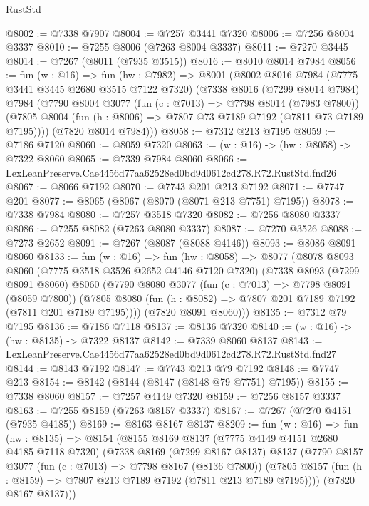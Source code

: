 \begin{lexlean}{RustStd}
\begin{coremodule}
@8002 := @7338 @7907
@8004 := @7257 @3441 @7320
@8006 := @7256 @8004 @3337
@8010 := @7255 @8006 (@7263 @8004 @3337)
@8011 := @7270 @3445
@8014 := @7267 (@8011 (@7935 @3515))
@8016 := @8010 @8014 @7984
@8056 := fun (w : @16) =>
  fun (hw : @7982) =>
  @8001
    (@8002
      @8016
      @7984
      (@7775 @3441 @3445 @2680 @3515 @7122 @7320)
      (@7338
        @8016
        (@7299 @8014 @7984)
        @7984
        (@7790
          @8004
          @3077
          (fun (c : @7013) => @7798 @8014 (@7983 @7800))
          (@7805 @8004 (fun (h : @8006) => @7807 @73 @7189 @7192 (@7811 @73 @7189 @7195))))
        (@7820 @8014 @7984)))
@8058 := @7312 @213 @7195
@8059 := @7186 @7120
@8060 := @8059 @7320
@8063 := (w : @16) -> (hw : @8058) -> @7322 @8060
@8065 := @7339 @7984 @8060
@8066 := LexLeanPreserve.Cae4456d77aa62528ed0bd9d0612cd278.R72.RustStd.fnd26
@8067 := @8066 @7192
@8070 := @7743 @201 @213 @7192
@8071 := @7747 @201
@8077 := @8065 (@8067 (@8070 (@8071 @213 @7751) @7195))
@8078 := @7338 @7984
@8080 := @7257 @3518 @7320
@8082 := @7256 @8080 @3337
@8086 := @7255 @8082 (@7263 @8080 @3337)
@8087 := @7270 @3526
@8088 := @7273 @2652
@8091 := @7267 (@8087 (@8088 @4146))
@8093 := @8086 @8091 @8060
@8133 := fun (w : @16) =>
  fun (hw : @8058) =>
  @8077
    (@8078
      @8093
      @8060
      (@7775 @3518 @3526 @2652 @4146 @7120 @7320)
      (@7338
        @8093
        (@7299 @8091 @8060)
        @8060
        (@7790
          @8080
          @3077
          (fun (c : @7013) => @7798 @8091 (@8059 @7800))
          (@7805 @8080 (fun (h : @8082) => @7807 @201 @7189 @7192 (@7811 @201 @7189 @7195))))
        (@7820 @8091 @8060)))
@8135 := @7312 @79 @7195
@8136 := @7186 @7118
@8137 := @8136 @7320
@8140 := (w : @16) -> (hw : @8135) -> @7322 @8137
@8142 := @7339 @8060 @8137
@8143 := LexLeanPreserve.Cae4456d77aa62528ed0bd9d0612cd278.R72.RustStd.fnd27
@8144 := @8143 @7192
@8147 := @7743 @213 @79 @7192
@8148 := @7747 @213
@8154 := @8142 (@8144 (@8147 (@8148 @79 @7751) @7195))
@8155 := @7338 @8060
@8157 := @7257 @4149 @7320
@8159 := @7256 @8157 @3337
@8163 := @7255 @8159 (@7263 @8157 @3337)
@8167 := @7267 (@7270 @4151 (@7935 @4185))
@8169 := @8163 @8167 @8137
@8209 := fun (w : @16) =>
  fun (hw : @8135) =>
  @8154
    (@8155
      @8169
      @8137
      (@7775 @4149 @4151 @2680 @4185 @7118 @7320)
      (@7338
        @8169
        (@7299 @8167 @8137)
        @8137
        (@7790
          @8157
          @3077
          (fun (c : @7013) => @7798 @8167 (@8136 @7800))
          (@7805 @8157 (fun (h : @8159) => @7807 @213 @7189 @7192 (@7811 @213 @7189 @7195))))
        (@7820 @8167 @8137)))

\end{coremodule}
\end{lexlean}
